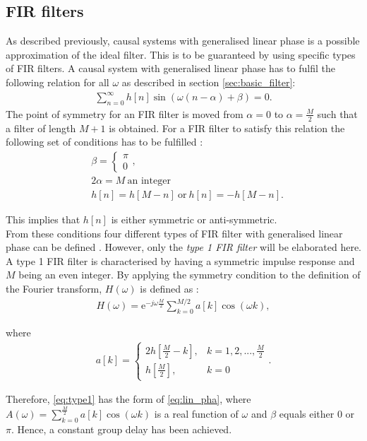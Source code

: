 \subsection{FIR filters}
As described previously, causal systems with generalised linear phase is a possible approximation of the ideal filter. This is to be guaranteed by using specific types of FIR filters. A causal system with generalised linear phase has to fulfil the following relation for all $\omega$ as described in section \ref{sec:basic_filter}:
\begin{align*}
\sum_{n=0}^{\infty}h[n]\sin\left(\omega \left(n-\alpha \right) + \beta \right) = 0.
\end{align*}
The point of symmetry for an FIR filter is moved from $\alpha=0$ to $\alpha=\frac{M}{2}$ such that a filter of length $M+1$ is obtained. For a FIR filter to satisfy this relation the following set of conditions has to be fulfilled \cite{page 341, DTSP}:
\begin{align} \label{eq:FIR_con}
&\beta = \left\{ \begin{matrix}
\pi \\
0
\end{matrix}\right., \nonumber  \\ 
&2\alpha = M \ \text{an integer} \\ 
&h[n]=h[M-n] \ \text{or} \ h[n]=-h[M-n]. \nonumber  
\end{align}

This implies that $h[n]$ is either symmetric or anti-symmetric. \\
From these conditions four different types of FIR filter with generalised linear phase can be defined \cite{pages 343-344, DTSP}. However, only the \textit{type 1 FIR filter} will be elaborated here.
A type 1 FIR filter is characterised by having a symmetric impulse response and $M$ being an even integer. By applying the symmetry condition to the definition of the Fourier transform, $H(\omega)$ is defined as \cite{page 343, DTSP}:
\begin{align} \label{eq:type1}
H(\omega) = \text{e}^{-j\omega \frac{M}{2}} \sum_{k=0}^{M/2} a[k] \cos (\omega k),
\end{align}

where 
\begin{align*}
a[k]=\begin{cases}
2h\left[ \frac{M}{2} - k \right], &k= 1,2,... ,\frac{M}{2}\\
h[\frac{M}{2}], &k=0
\end{cases}.
\end{align*}

Therefore, \eqref{eq:type1} has the form of \eqref{eq:lin_pha}, where $A(\omega) = \sum_{k=0}^{\frac{M}{2}} a[k]\cos (\omega k)$ is a real function of $\omega$ and $\beta$ equals either 0 or $\pi$. Hence, a constant group delay has been achieved.